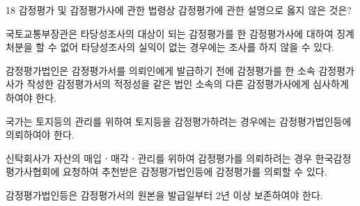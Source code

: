 \begin{question}{18}
감정평가 및 감정평가사에 관한 법령상 감정평가에 관한 설명으로 옳지 않은 것은?
\begin{choices}
  \item 국토교통부장관은 타당성조사의 대상이 되는 감정평가를 한 감정평가사에 대하여 징계처분을 할 수 없어 타당성조사의 실익이 없는 경우에는 조사를 하지 않을 수 있다.
  \item 감정평가법인은 감정평가서를 의뢰인에게 발급하기 전에 감정평가를 한 소속 감정평가사가 작성한 감정평가서의 적정성을 같은 법인 소속의 다른 감정평가사에게 심사하게 하여야 한다.
  \item 국가는 토지등의 관리를 위하여 토지등을 감정평가하려는 경우에는 감정평가법인등에 의뢰하여야 한다.
  \item 신탁회사가 자산의 매입ㆍ매각ㆍ관리를 위하여 감정평가를 의뢰하려는 경우 한국감정평가사협회에 요청하여 추천받은 감정평가법인등에 감정평가를 의뢰할 수 있다.
  \item 감정평가법인등은 감정평가서의 원본을 발급일부터 2년 이상 보존하여야 한다.
\end{choices}
\end{question}
